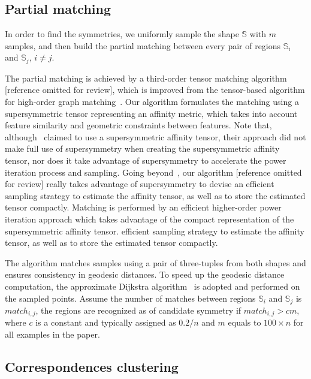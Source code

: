 \subsection{Partial matching}
\label{subsec:matching}

In order to find the symmetries, we uniformly sample the shape $\mathbb{S}$ with $m$ samples,
and then build the partial matching between every pair of regions $\mathbb{S}_i$ and $\mathbb{S}_j$, $i \neq j$.

The partial matching is achieved by a third-order tensor matching algorithm [reference omitted for review],
which is improved from the tensor-based algorithm for high-order graph matching~\cite{Duchenne2011}.
Our algorithm formulates the matching using a supersymmetric tensor representing an affinity metric,
which takes into account feature similarity and geometric constraints between features.
Note that, although~\cite{Duchenne2011} claimed to use a supersymmetric affinity tensor,
their approach did not make full use of supersymmetry when creating the supersymmetric affinity tensor, nor does it take advantage of supersymmetry
to accelerate the power iteration process and sampling.
Going beyond~\cite{Duchenne2011}, our algorithm [reference omitted for review] really takes advantage of supersymmetry to devise an
efficient sampling strategy to estimate the affinity tensor, as well as to store the estimated tensor compactly.
Matching is performed by an efficient higher-order power iteration approach which takes advantage of the compact representation of the supersymmetric affinity tensor.
efficient sampling strategy to estimate the affinity tensor, as well as to store the estimated tensor compactly.

The algorithm matches samples using a pair of three-tuples from both shapes and ensures consistency in geodesic distances.
To speed up the geodesic distance computation, the approximate Dijkstra algorithm~\cite{Dijkstra1959} is adopted and performed on the sampled points.
Assume the number of matches between regions $\mathbb{S}_i$ and $\mathbb{S}_j$ is $match_{i,j}$,
the regions are recognized as of candidate symmetry if $match_{i,j} > cm$, where $c$ is a constant and typically assigned as $0.2/n$ and $m$ equals to $100 \times n$
for all examples in the paper.


\subsection{Correspondences clustering}

